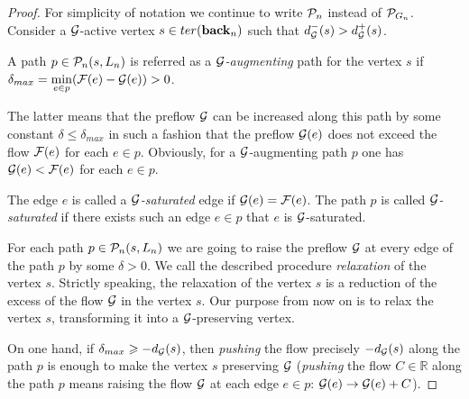 \documentclass[12pt,oneside,a4paper]{amsart}
\begin{document}
\begin{proof}
        For simplicity of notation we continue to write $\gnpaths$ instead of $\cal{P}_{G_n}$.
        Consider a $\cal{G}$-active vertex $s \in \ter(\eback_n)$ such that $d_{\cal{G}}^{-}(s) > d_{\cal{G}}^{+}(s)$.
        \begin{definition}
          A path $p \in \gnpaths(s, L_n)$ is referred as a \emph{$\cal{G}$-augmenting} path for the vertex $s$
            if $\delta_{max}=\min\limits_{e \in p}(\flowpos(e) - \cal{G}(e)) > 0$.
        \end{definition}
        The latter means that the preflow $\cal{G}$ can be increased along this path by some constant $\delta \leq \delta_{max}$
          in such a fashion that the preflow $\cal{G}(e)$ does not exceed the flow $\flowpos(e)$ for each $e \in p$.
        Obviously, for a $\cal{G}$-augmenting path $p$ one has $\cal{G}(e) < \flowpos(e)$ for each $e \in p$.
        \begin{definition}
          The edge $e$ is called a \emph{$\cal{G}$-saturated} edge if $\cal{G}(e) = \flowpos(e)$.
          The path $p$ is called \emph{$\cal{G}$-saturated} if there exists such an edge $e \in p$ that $e$ is $\cal{G}$-saturated.
        \end{definition}
        For each path $p \in \gnpaths(s, L_n)$ we are going to raise the preflow $\cal{G}$ at every edge of the path $p$
        by some $\delta > 0$.
        We call the described procedure \emph{relaxation} of the vertex $s$.
        Strictly speaking, the {relaxation}
          of the vertex $s$ is a reduction of the excess of the flow $\cal{G}$ in the vertex $s$.
        Our purpose from now on is to relax the vertex $s$, transforming it into a $\cal{G}$-preserving vertex.

        On one hand, if $\delta_{max} \geq -d_{\cal{G}}(s)$, then \emph{pushing} the flow precisely $-d_{\cal{G}}(s)$ along the path $p$
          is enough to make the vertex $s$ preserving $\cal{G}$
          (\emph{pushing} the flow $C \in \mathbb{R}$ along the path $p$ means raising the flow $\cal{G}$ at each edge $e \in p$:
          $\cal{G}(e) \to \cal{G}(e) + C$).


\end{proof}
\end{document}
